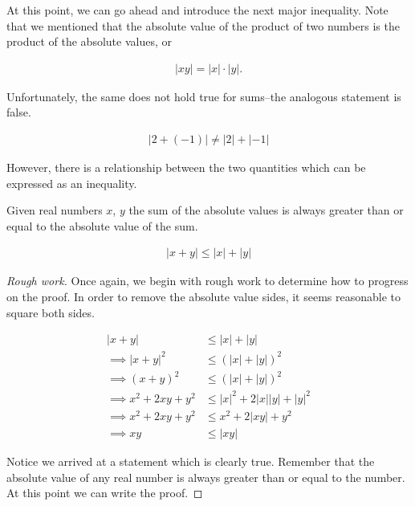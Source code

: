 At this point, we can go ahead and introduce the next major inequality. Note that we mentioned that the absolute value of the product of two numbers is the product of the absolute values, or

\begin{align*}
	|xy| = |x| \cdot |y|.
\end{align*}

Unfortunately, the same does not hold true for sums--the analogous statement is false.

\begin{align*}
	|2 + (-1)| \neq |2| + |-1|
\end{align*}

However, there is a relationship between the two quantities which can be expressed as an inequality. \\

\begin{theorem}
	Given real numbers $x$, $y$ the sum of the absolute values is always greater than or equal to the absolute value of the sum.
	
	\begin{align}
		|x + y| \le |x| + |y|
	\end{align}
\end{theorem}

\begin{proof}[Rough work]\let\qed\relax
	Once again, we begin with rough work to determine how to progress on the proof. In order to remove the absolute value sides, it seems reasonable to square both sides.
	
	\begin{align*}
		|x + y| &\le |x| + |y| \\
		\implies |x + y|^2 &\le (|x| + |y|)^2 \\
		\implies (x + y)^2 &\le (|x| + |y|)^2 \\
		\implies x^2 + 2xy + y^2 &\le |x|^2 + 2|x||y| + |y|^2 \\
		\implies x^2 + 2xy + y^2 &\le x^2 + 2|xy| + y^2 \\
		\implies xy &\le |xy|
	\end{align*}
	
	Notice we arrived at a statement which is clearly true. Remember that the absolute value of any real number is always greater than or equal to the number. At this point we can write the proof.
\end{proof}

